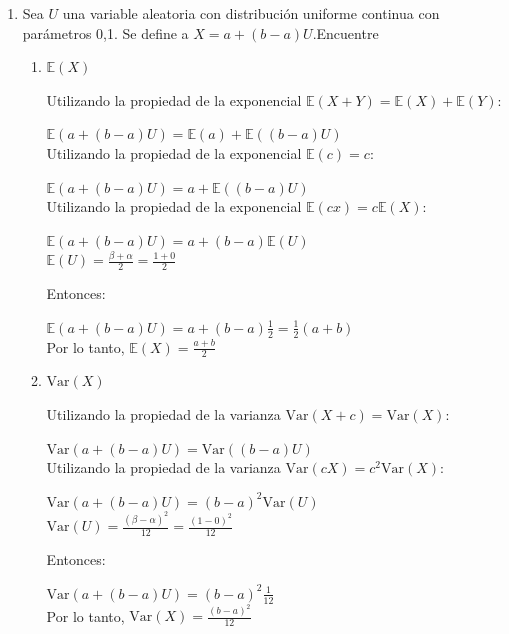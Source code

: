 \documentclass[11pt,a4paper]{report}
\begin{document}
\begin{enumerate}
		\item{
			Sea $U$ una variable aleatoria con distribución uniforme continua
			con parámetros 0,1. Se define a $X = a+(b - a)U$.Encuentre
			\begin{enumerate}
				\item {
					$\mathbb{E}(X)$

					Utilizando la propiedad de la exponencial $\mathbb{E}(X + Y) = \mathbb{E}(X) + \mathbb{E}(Y)$:

					$\mathbb{E}(a+(b - a)U) = \mathbb{E}(a) + \mathbb{E}((b - a)U)$\\

					Utilizando la propiedad de la exponencial $\mathbb{E}(c) = c$:

					$\mathbb{E}(a+(b - a)U) = a + \mathbb{E}((b - a)U)$\\

					Utilizando la propiedad de la exponencial $\mathbb{E}(cx) = c\mathbb{E}(X)$:

					$\mathbb{E}(a+(b - a)U) = a + (b - a)\mathbb{E}(U)$\\

					$\mathbb{E}(U) = \frac{\beta + \alpha}{2} = \frac{1+0}{2}$

					Entonces:

					$\mathbb{E}(a+(b - a)U) = a + (b - a)\frac{1}{2} = \frac{1}{2}(a+b)$\\


					Por lo tanto, $\mathbb{E}(X) = \frac{a+b}{2}$\\


				}

				\item {
					$\text{Var}(X)$

					Utilizando la propiedad de la varianza $\text{Var}(X + c) = \text{Var}(X)$:

					$\text{Var}(a+(b - a)U) = \text{Var}((b - a)U)$\\

					Utilizando la propiedad de la varianza $\text{Var}(cX) = c^2\text{Var}(X)$:

					$\text{Var}(a+(b - a)U) = (b - a)^2 \text{Var}(U)$\\


					$\text{Var}(U) = \frac{(\beta - \alpha)^2}{12} = \frac{(1-0)^2}{12}$

					Entonces:

					$\text{Var}(a+(b - a)U) = (b - a)^2\frac{1}{12}$ \\


					Por lo tanto, $\text{Var}(X) = \frac{(b - a)^2}{12}$ \\
				}
			\end{enumerate}
			}
	\end{enumerate}
\end{document}

